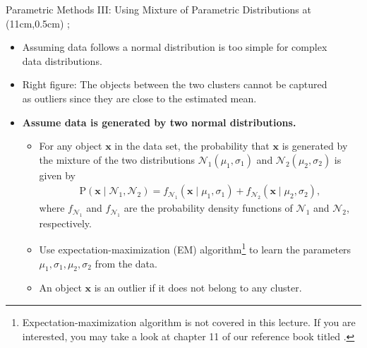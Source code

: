 \begin{frame}{Parametric Methods III: Using Mixture of Parametric Distributions}
	\tikzoverlay at (11cm,0.5cm) {};
	\begin{itemize}
		\item Assuming data follows a normal distribution is too simple for complex\\ data distributions.
		\item Right figure: The objects between the two clusters cannot be captured\\ as outliers since they are close to the estimated mean.
		\item \textbf{Assume data is generated by {\color{airforceblue}two normal distributions.}}
		      \begin{itemize}
			      \item For any object $\mathbf{x}$ in the data set, the probability that $\mathbf{x}$ is generated by the mixture of the two distributions $\mathcal{N}_1(\mu_1, \sigma_1)$ and $\mathcal{N}_2(\mu_2, \sigma_2)$ is given by
			            \begin{align}
				            \text{P}(\mathbf{x} \; \vert \; \mathcal{N}_1, \mathcal{N}_2) = f_{\mathcal{N}_1}(\mathbf{x} \; \vert \; \mu_1, \sigma_1) + f_{\mathcal{N}_2}(\mathbf{x} \; \vert \; \mu_2, \sigma_2),
			            \end{align}
			            where $f_{\mathcal{N}_1}$ and $f_{\mathcal{N}_1}$ are the probability density functions of $\mathcal{N}_1$ and $\mathcal{N}_2$, respectively.
			      \item Use expectation-maximization (EM) algorithm\footnote{Expectation-maximization algorithm is not covered in this lecture. If you are interested, you may take a look at chapter 11 of our reference book titled .} to learn the parameters $\mu_1, \sigma_1, \mu_2, \sigma_2$ from the data.
			      \item An object $\mathbf{x}$ is an outlier if it does not belong to any cluster.
		      \end{itemize}
	\end{itemize}
\end{frame}


